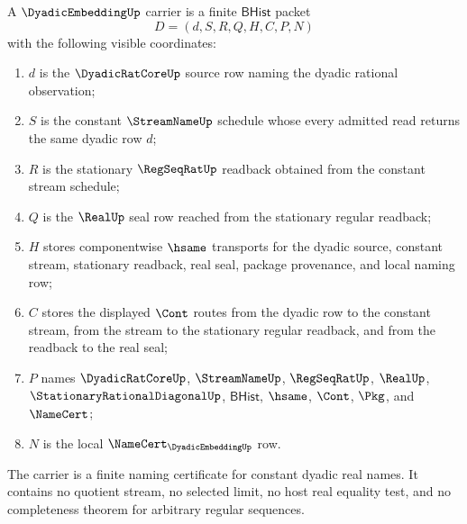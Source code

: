 \begin{definition}
\label{def:dyadic-embedding-carrier}
A $\DyadicEmbeddingUp$ carrier is a finite $\mathsf{BHist}$ packet
$$
D=(d,S,R,Q,H,C,P,N)
$$
with the following visible coordinates:
\begin{enumerate}
\item $d$ is the $\DyadicRatCoreUp$ source row naming the dyadic rational observation;
\item $S$ is the constant $\StreamNameUp$ schedule whose every admitted read returns the same dyadic row $d$;
\item $R$ is the stationary $\RegSeqRatUp$ readback obtained from the constant stream schedule;
\item $Q$ is the $\RealUp$ seal row reached from the stationary regular readback;
\item $H$ stores componentwise $\hsame$ transports for the dyadic source, constant stream, stationary readback, real seal, package provenance, and local naming row;
\item $C$ stores the displayed $\Cont$ routes from the dyadic row to the constant stream, from the stream to the stationary regular readback, and from the readback to the real seal;
\item $P$ names $\DyadicRatCoreUp$, $\StreamNameUp$, $\RegSeqRatUp$, $\RealUp$, $\StationaryRationalDiagonalUp$, $\mathsf{BHist}$, $\hsame$, $\Cont$, $\Pkg$, and $\NameCert$;
\item $N$ is the local $\NameCert_{\DyadicEmbeddingUp}$ row.
\end{enumerate}
The carrier is a finite naming certificate for constant dyadic real names. It contains no quotient stream, no selected limit, no host real equality test, and no completeness theorem for arbitrary regular sequences.
\end{definition}

